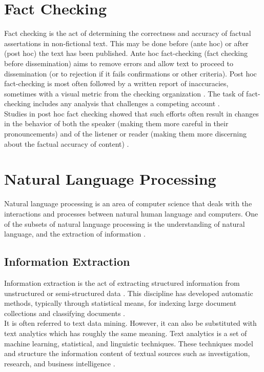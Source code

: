 \documentclass[10pt,11pt,12pt,oneside]{book}
\begin{document}
	\section{Fact Checking}
	
	Fact checking is the act of determining the correctness and accuracy of factual assertations in non-fictional text. This may be done before (ante hoc) or after (post hoc) the text has been published. Ante hoc fact-checking (fact checking before dissemination) aims to remove errors and allow text to proceed to dissemination (or to rejection if it fails confirmations or other criteria). Post hoc fact-checking is most often followed by a written report of inaccuracies, sometimes with a visual metric from the checking organization \cite{fellmeth_horwitz_2009}. The task of fact-checking includes any analysis that challenges a competing account \cite{graves_2016}.\\[8pt]
	
	Studies in post hoc fact checking showed that such efforts often result in changes in the behavior of both the speaker (making them more careful in their pronouncements) and of the listener or reader (making them more discerning about the factual accuracy of content) \cite{amazeen_2015}.
	
	\section{Natural Language Processing}
	
	Natural language processing is an area of computer science that deals with the interactions and processes between natural human language and computers. One of the subsets of natural language processing is the understanding of natural language, and the extraction of information \cite{bird2009natural}.\\
	
	\subsection{Information Extraction}
	Information extraction is the act of extracting structured information from unstructured or semi-structured data \cite{mooney2005mining}. This discipline has developed automatic methods, typically through statistical means, for indexing large document collections and classifying documents \cite{freitag2000machine}.\\[8pt]
	
	It is often referred to text data mining. However, it can also be substituted with text analytics which has roughly the same meaning. Text analytics is a set of machine learning, statistical, and linguistic techniques. These techniques model and structure the information content of textual sources such as investigation, research, and business intelligence \cite{sethgrimes}.\\
	
\end{document}
